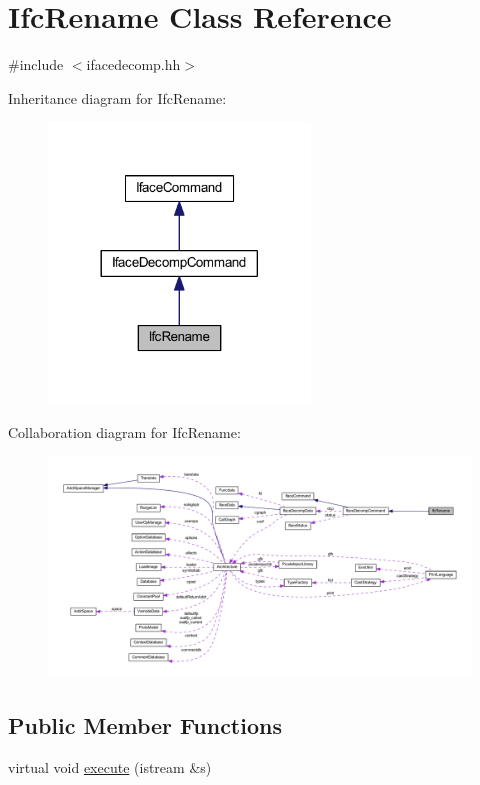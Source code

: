 \hypertarget{class_ifc_rename}{}\section{Ifc\+Rename Class Reference}
\label{class_ifc_rename}


{\ttfamily \#include $<$ifacedecomp.\+hh$>$}



Inheritance diagram for Ifc\+Rename\+:
\nopagebreak
\begin{figure}[H]
\begin{center}
\leavevmode
\includegraphics[width=197pt]{class_ifc_rename__inherit__graph}
\end{center}
\end{figure}


Collaboration diagram for Ifc\+Rename\+:
\nopagebreak
\begin{figure}[H]
\begin{center}
\leavevmode
\includegraphics[width=350pt]{class_ifc_rename__coll__graph}
\end{center}
\end{figure}
\subsection*{Public Member Functions}
\begin{DoxyCompactItemize}
\item 
virtual void \mbox{\hyperlink{class_ifc_rename_a7c7b89bc0716bd3c4e7efc6c28cff73a}{execute}} (istream \&s)
\end{DoxyCompactItemize}
